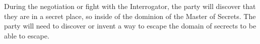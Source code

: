 During the negotiation or fight with the Interrogator, the party will discover that they are in a secret place, so inside of the dominion of the Master of Secrets.
The party will need to discover or invent a way to escape the domain of secrects to be able to escape.

